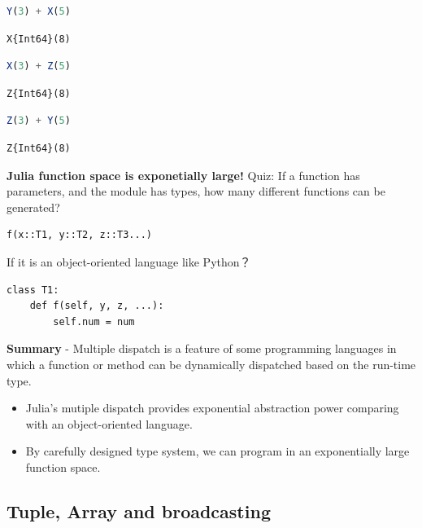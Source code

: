 \documentclass[
  notoc %
]{tufte-book}
\begin{document}
\begin{lstlisting}[language=Julia]
Y(3) + X(5)
\end{lstlisting}

\begin{lstlisting}[language=Output]
X{Int64}(8)
\end{lstlisting}

\begin{lstlisting}[language=Julia]
X(3) + Z(5)
\end{lstlisting}

\begin{lstlisting}[language=Output]
Z{Int64}(8)
\end{lstlisting}

\begin{lstlisting}[language=Julia]
Z(3) + Y(5)
\end{lstlisting}

\begin{lstlisting}[language=Output]
Z{Int64}(8)
\end{lstlisting}

\textbf{Julia function space is exponetially large!} Quiz: If a function
has parameters, and the module has types, how many different functions
can be generated?

\begin{lstlisting}
f(x::T1, y::T2, z::T3...)
\end{lstlisting}

If it is an object-oriented language like Python？

\begin{lstlisting}
class T1:
    def f(self, y, z, ...):
        self.num = num
\end{lstlisting}

\textbf{Summary} - Multiple dispatch is a feature of some programming
languages in which a function or method can be dynamically dispatched
based on the run-time type.

\begin{itemize}
\item
  Julia's mutiple dispatch provides exponential abstraction power
  comparing with an object-oriented language.
\item
  By carefully designed type system, we can program in an exponentially
  large function space.
\end{itemize}

\hypertarget{tuple-array-and-broadcasting}{%
\subsection{Tuple, Array and
broadcasting}\label{tuple-array-and-broadcasting}}
\end{document}
